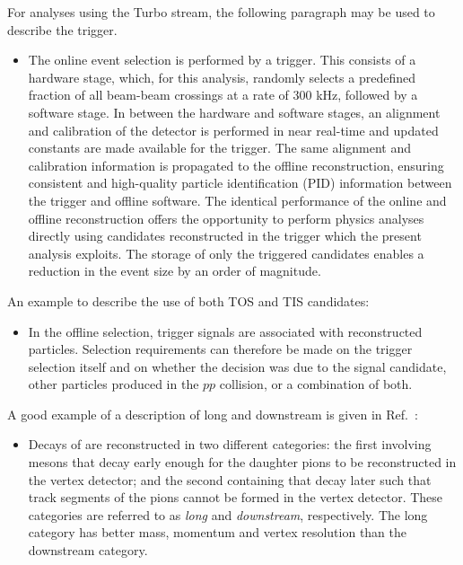 For analyses using the Turbo stream, the following paragraph may 
be used to describe the trigger.
\begin{itemize}
\item The online event selection is performed by a trigger. This consists 
      of a hardware stage, which, for this analysis, randomly selects a 
      predefined fraction of all beam-beam crossings at a rate of 300 kHz, 
      followed by a software stage. In between the hardware and software
      stages, an alignment and calibration of the detector is performed in 
      near real-time \cite{LHCb-PROC-2015-011} and updated constants are made
      available for the trigger.
      The same alignment and calibration information is propagated 
      to the offline reconstruction, ensuring consistent and high-quality 
      particle identification (PID) information between the trigger and 
      offline software. The identical performance of the online and offline 
      reconstruction offers the opportunity to perform physics analyses 
      directly using candidates reconstructed in the trigger 
      \cite{LHCb-DP-2012-004,LHCb-DP-2016-001} 
      which the present analysis exploits. The storage of only the triggered
      candidates enables a reduction in the event size by an order 
      of magnitude.
\end{itemize}

An example to describe the use of both TOS and TIS candidates:
\begin{itemize}
\item In the offline selection, trigger signals are associated with reconstructed particles.
Selection requirements can therefore be made on the trigger selection itself
and on whether the decision was due to the signal candidate, other particles produced in the $pp$ collision, or a combination of both.
\end{itemize}

A good example of a description of long and downstream \KS is given in 
Ref.~\cite{LHCb-PAPER-2014-006}:
\begin{itemize}
\item
Decays of \decay{\KS}{\pip\pim} are reconstructed in two different categories:
the first involving \KS mesons that decay early enough for the
daughter pions to be reconstructed in the vertex detector; and the
second containing \KS that decay later such that track segments of the
pions cannot be formed in the vertex detector. These categories are
referred to as \emph{long} and \emph{downstream}, respectively. The
long category has better mass, momentum and vertex resolution than the
downstream category.
\end{itemize}

